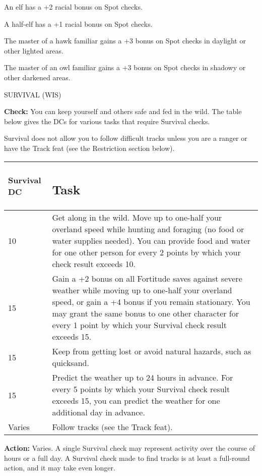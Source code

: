 \documentclass{article}
\begin{document}
An elf has a +2 racial bonus on Spot checks.

A half-elf has a +1 racial bonus on Spot checks.

The master of a hawk familiar gains a +3 bonus on Spot checks in daylight or other 
lighted areas.

The master of an owl familiar gains a +3 bonus on Spot checks in shadowy or other 
darkened areas.

\vspace{12pt}
SURVIVAL (WIS)

\textbf{Check:} You can keep yourself and others safe and fed in the wild. The 
table below gives the DCs for various tasks that require Survival checks.

Survival does not allow you to follow difficult tracks unless you are a ranger 
or have the Track feat (see the Restriction section below).

\vspace{12pt}
\begin{tabular}{|>{\raggedright}p{29pt}|>{\raggedright}p{297pt}|}
\hline
S\textbf{urvival DC } & \subsection*{T\textbf{ask}}\tabularnewline
\hline
10  & Get along in the wild. Move up to one-half your overland speed while hunting 
and foraging (no food or water supplies needed). You can provide food and water 
for one other person for every 2 points by which your check result exceeds 10.\tabularnewline
\hline
15 & Gain a +2 bonus on all Fortitude saves against severe weather while moving 
up to one-half your overland speed, or gain a +4 bonus if you remain stationary. 
You may grant the same bonus to one other character for every 1 point by which 
your Survival check result exceeds 15.\tabularnewline
\hline
15  & Keep from getting lost or avoid natural hazards, such as quicksand.\tabularnewline
\hline
15  & Predict the weather up to 24 hours in advance. For every 5 points by which 
your Survival check result exceeds 15, you can predict the weather for one additional 
day in advance.\tabularnewline
\hline
Varies  & Follow tracks (see the Track feat).\tabularnewline
\hline
\end{tabular}

\vspace{12pt}
\textbf{Action:} Varies. A single Survival check may represent activity over the 
course of hours or a full day. A Survival check made to find tracks is at least 
a full-round action, and it may take even longer.
\end{document}
